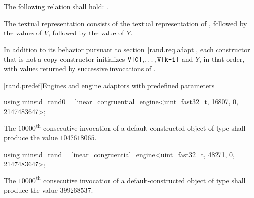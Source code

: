 \pnum
The following relation shall hold:
  .

\pnum
The textual representation%
%
consists of
 the textual representation of ,
followed by
 the  values of $V$,
followed by
 the value of $Y$.

\pnum
In addition to its behavior
pursuant to section~\ref{rand.req.adapt},
each constructor%
that is not a copy constructor
initializes $\texttt{\protect V[0]}, \ldots, \texttt{\protect V[k-1]}$ and $Y$,
in that order,
with values returned by successive invocations of .%




[rand.predef]{Engines and engine adaptors with predefined parameters}%
%
%

%
%
\begin{itemdecl}
using minstd_rand0 =
      linear_congruential_engine<uint_fast32_t, 16807, 0, 2147483647>;
\end{itemdecl}

\begin{itemdescr}
\pnum\required
 The $10000^{\,\mathrm{th}}$ consecutive invocation
 of a default-constructed object
 of type 
 shall produce the value $1043618065$.
\end{itemdescr}

%
%
\begin{itemdecl}
using minstd_rand =
      linear_congruential_engine<uint_fast32_t, 48271, 0, 2147483647>;
\end{itemdecl}

\begin{itemdescr}
\pnum\required
 The $10000^{\,\mathrm{th}}$ consecutive invocation
 of a default-constructed object
 of type 
 shall produce the value $399268537$.
\end{itemdescr}

